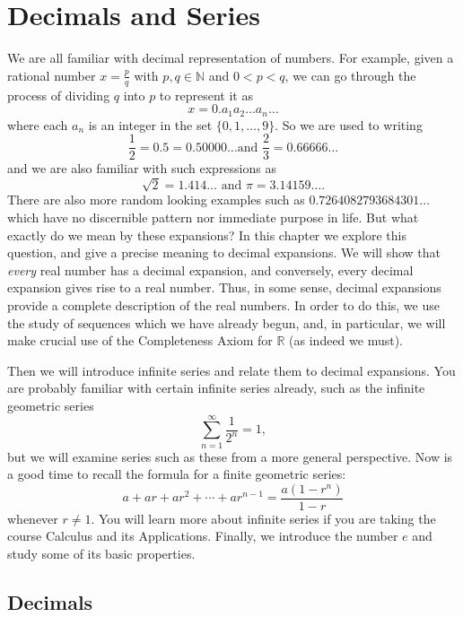 \documentclass[11pt,dvipsnames]{book}
\numberwithin{figure}{section} %
\numberwithin{table}{section} %
\begin{document}
\chapter{Decimals and Series}%
\label{decimalsseries}
We are all familiar with decimal representation of numbers. For example, given a rational number $x = \frac{p}{q}$ with $p, q \in \mathbb{N}$ and $0 < p < q$, we can go through the process of dividing $q$ into $p$ to represent it as
\[ x = 0.a_1 a_2 \dots a_n \dots\]
where each $a_n$ is an integer in the set $\{0,1,\dots, 9\}$. So we are used to writing \[ \frac{1}{2} = 0.5 = 0.50000\dots \mbox{
and } \frac{2}{3} = 0.66666\dots\]
and we are also familiar with such expressions as
\[ \sqrt{2} = 1.414\dots \mbox{ and } \pi = 3.14159 \dots. \]
There are also more random looking examples such as $0.7264082793684301...$ which have no discernible pattern nor immediate purpose in life. But what exactly do we mean by these expansions? In this chapter we explore this question, and give a precise meaning to decimal expansions. We will show that {\em every} real number has a decimal expansion, and conversely, every decimal expansion gives rise to a real number. Thus, in some sense, decimal expansions provide a complete description of the real numbers. In order to do this, we use the study of sequences which we have already begun, and, in particular, we will make crucial use of the Completeness Axiom for $\mathbb{R}$ (as indeed we must).

Then we will introduce infinite series and relate them to decimal expansions. You are probably familiar with certain infinite series already, such as the infinite geometric series
\[ \sum_{n=1}^\infty \frac{1}{2^n} = 1,\]
but we will examine series such as these from a more general perspective. Now is a good time to recall the formula for a finite geometric series:
\[ a + ar + ar^2 + \cdots + ar^{n-1} = \frac{a(1-r^{n})}{1-r}\]
whenever $r \neq 1$. You will learn more about infinite series if you are taking the course Calculus and its Applications. Finally, we introduce the number $e$ and study some of its basic properties.

\section{Decimals}%
\label{decimals}
\end{document}
